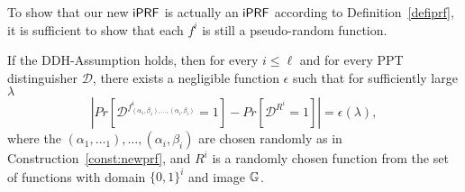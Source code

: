 
To show that our new $\mathsf{i}\mathsf{PRF}$ is actually an $\mathsf{i}\mathsf{PRF}$ according to
Definition~\ref{defiprf}, it is sufficient to show that each $f^i$ is
still a pseudo-random function.

\begin{theorem}
\label{theorem:newprf}
If the DDH-Assumption holds, then for every $i\leq\ell$ and for every
PPT distinguisher $\mathcal{D}$, there exists a negligible function
$\epsilon$ such that for sufficiently large $\lambda$
$$|
Pr[\mathcal{D}^{f^i_{(\alpha_1,\beta_1),\ldots,(\alpha_i,\beta_i)}}=1]
- Pr[\mathcal{D}^{R^i} = 1]| =\epsilon(\lambda), $$ where the
$(\alpha_1,\ldots_1),\ldots,(\alpha_i,\beta_i)$ are chosen randomly as
in Construction~\ref{const:newprf}, and $R^i$ is a randomly chosen
function from the set of functions with domain $\{0,1\}^i$ and image
$\mathbb{G}$.

\end{theorem}

